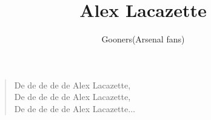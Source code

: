 \documentclass[a4paper,12pt]{article}
\title{Alex Lacazette}
\author{Gooners(Arsenal fans)}
\date{}
\begin{document}
	
	\maketitle
	
	\begin{verse}
		
		De de de de de Alex Lacazette, \\
		De de de de de Alex Lacazette, \\
		De de de de de Alex Lacazette$\ldots$
		
	\end{verse}
	
\end{document}
